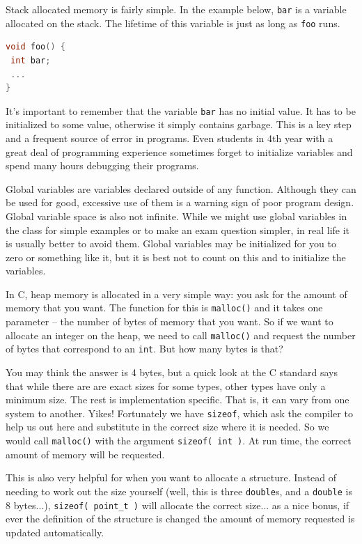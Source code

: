 \documentclass[a4paper]{report}
\begin{document}
Stack allocated memory is fairly simple. In the example below, \texttt{bar} is a variable allocated on the stack. The lifetime of this variable is just as long as \texttt{foo} runs.

\begin{lstlisting}[language=C]
void foo() {
 int bar;
 ...
}
\end{lstlisting}

It's important to remember that the variable \texttt{bar} has no initial value. It has to be initialized to some value, otherwise it simply contains garbage. This is a key step and a frequent source of error in programs. Even students in 4th year with a great deal of programming experience sometimes forget to initialize variables and spend many hours debugging their programs.

Global variables are variables declared outside of any function. Although they can be used for good, excessive use of them is a warning sign of poor program design. Global variable space is also not infinite. While we might use global variables in the class for simple examples or to make an exam question simpler, in real life it is usually better to avoid them. Global variables may be initialized for you to zero or something like it, but it is best not to count on this and to initialize the variables.

In C, heap memory is allocated in a very simple way: you ask for the amount of memory that you want. The function for this is \texttt{malloc()} and it takes one parameter -- the number of bytes of memory that you want. So if we want to allocate an integer on the heap, we need to call \texttt{malloc()} and request the number of bytes that correspond to an \texttt{int}. But how many bytes is that?

You may think the answer is 4 bytes, but a quick look at the C standard says that while there are are exact sizes for some types, other types have only a minimum size. The rest is implementation specific. That is, it can vary from one system to another. Yikes! Fortunately we have \texttt{sizeof}, which ask the compiler to help us out here and substitute in the correct size where it is needed. So we would call \texttt{malloc()} with the argument \texttt{sizeof( int )}. At run time, the correct amount of memory will be requested.

This is also very helpful for when you want to allocate a structure. Instead of needing to work out the size yourself (well, this is three \texttt{double}s, and a \texttt{double} is 8 bytes...), \texttt{sizeof( point\_t )} will allocate the correct size... as a nice bonus, if ever the definition of the structure is changed the amount of memory requested is updated automatically.
\end{document}

